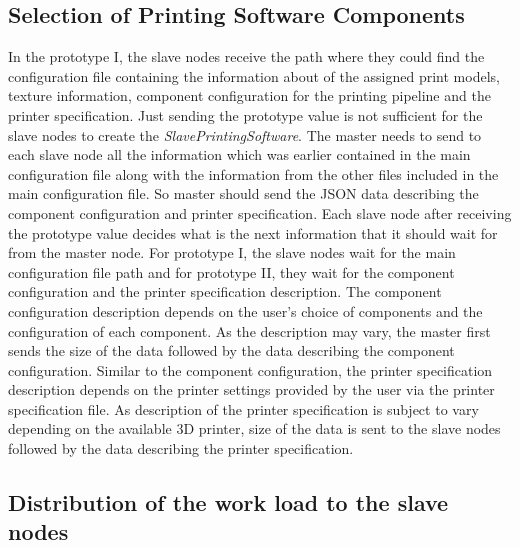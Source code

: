 \subsection{Selection of Printing Software Components}
In the prototype I, the slave nodes receive the path where they could find the configuration file containing the information about of the assigned print models, texture information, component configuration for the printing pipeline and the printer specification. Just sending the prototype value is not sufficient for the slave nodes to create the \textit{SlavePrintingSoftware}. The master needs to send to each slave node all the information which was earlier contained in the main configuration file along with the information from the other files included in the main configuration file. So master should send the JSON data describing the component configuration and printer specification. Each slave node after receiving the prototype value decides what is the next information that it should wait for from the master node. For prototype I, the slave nodes wait for the main configuration file path and for prototype II, they wait for the component configuration and the printer specification description. The component configuration description depends on the user's choice of components and the configuration of each component. As the description may vary, the master first sends the size of the data followed by the data describing the component configuration. Similar to the component configuration, the printer specification description depends on the printer settings provided by the user via the printer specification file. As description of the printer specification is subject to vary depending on the available 3D printer, size of the data is sent to the slave nodes followed by the data describing the printer specification.\newline 

\subsection{Distribution of the work load to the slave nodes}

